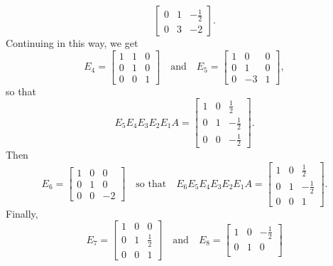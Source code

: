 \begin{solution}
\begin{equation*}
\begin{bmatrix}
      0 & 1 & -\frac12 \\[3pt]
      0 & 3 & -2
    \end{bmatrix}.
  \end{equation*}
  Continuing in this way, we get
  \begin{equation*}
    E_4 =
    \begin{bmatrix}
      1 & 1 & 0 \\
      0 & 1 & 0 \\
      0 & 0 & 1
    \end{bmatrix}
    \quad\text{and}\quad
    E_5 =
    \begin{bmatrix}
      1 & 0 & 0 \\
      0 & 1 & 0 \\
      0 & -3 & 1
    \end{bmatrix},
  \end{equation*}
  so that
  \begin{equation*}
    E_5E_4E_3E_2E_1A =
    \begin{bmatrix}
      1 & 0 & \frac12 \\[3pt]
      0 & 1 & -\frac12 \\[3pt]
      0 & 0 & -\frac12
    \end{bmatrix}.
  \end{equation*}
  Then
  \begin{equation*}
    E_6 =
    \begin{bmatrix}
      1 & 0 & 0 \\
      0 & 1 & 0 \\
      0 & 0 & -2
    \end{bmatrix}
    \quad\text{so that}\quad
    E_6E_5E_4E_3E_2E_1A =
    \begin{bmatrix}
      1 & 0 & \frac12 \\[3pt]
      0 & 1 & -\frac12 \\[3pt]
      0 & 0 & 1
    \end{bmatrix}.
  \end{equation*}
  Finally,
  \begin{equation*}
    E_7 =
    \begin{bmatrix}
      1 & 0 & 0 \\[3pt]
      0 & 1 & \frac12 \\[3pt]
      0 & 0 & 1
    \end{bmatrix}
    \quad\text{and}\quad
    E_8 =
    \begin{bmatrix}
      1 & 0 & -\frac12 \\[3pt]
      0 & 1 & 0 \\[3pt]

\end{bmatrix}
\end{equation*}
\end{solution}
